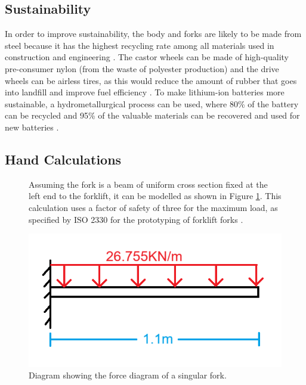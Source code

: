 \documentclass[12pt]{article}
\begin{document}
\subsection{Sustainability}
In order to improve sustainability, the body and forks are likely to be made from steel because it has the highest recycling rate among all materials used in construction and engineering \cite{baker2023}. The castor wheels can be made of high-quality pre-consumer nylon (from the waste of polyester production) \cite{eco2022} and the drive wheels can be airless tires, as this would reduce the amount of rubber that goes into landfill and improve fuel efficiency \cite{ImperialTyres}. To make lithium-ion batteries more sustainable, a hydrometallurgical process can be used, where 80\% of the battery can be recycled and 95\% of the valuable materials can be recovered and used for new batteries \cite{Lithium-ion}.

\subsection {Hand Calculations}
\begin{figure}[H]
    \centering
    \begin{minipage}[t]{0.5\textwidth}
        \vspace{0pt}
        \linespread{1.5}
        Assuming the fork is a beam of uniform cross section fixed at the left end to the forklift, it can be modelled as shown in Figure \ref{fig:x}. This calculation uses a factor of safety of three for the maximum load, as specified by ISO 2330 for the prototyping of forklift forks \cite{iso2330}.
    \end{minipage}%
    \hfill
    \begin{minipage}[t]{0.45\textwidth}
        \vspace{-32pt} 
        \centering
        \includegraphics[width=\linewidth]{fork as a beam diagram.png}
        \vspace{-40pt}
        \caption{Diagram showing the force diagram of a singular fork.}
        \label{fig:x}
    \end{minipage}
\end{figure}
\end{document}

